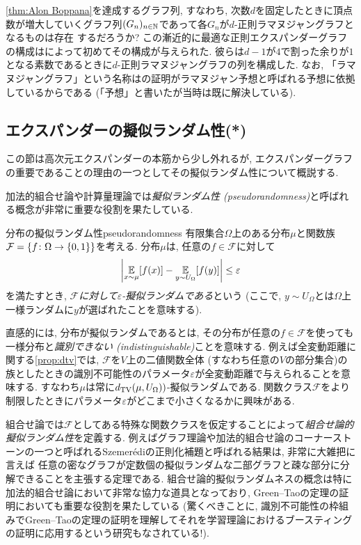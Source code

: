 \cref{thm:Alon Boppana}を達成するグラフ列, すなわち,
次数$d$を固定したときに頂点数が増大していくグラフ列$(G_n)_{n\in\mathbb{N}}$であって各$G_n$が$d$-正則ラマヌジャングラフとなるものは存在
するだろうか?
この漸近的に最適な正則エクスパンダーグラフの構成は\citet{LPS88}によって初めてその構成が与えられた.
彼らは$d-1$が$4$で割った余りが$1$となる素数であるときに$d$-正則ラマヌジャングラフの列を構成した.
なお, 「ラマヌジャングラフ」という名称は\cite{LPS88}の証明がラマヌジャン予想と呼ばれる予想に依拠しているからである
(「予想」と書いたが当時は既に解決している).

\subsection{エクスパンダーの擬似ランダム性(*)} \label{sec:expander pseudorandom}
この節は高次元エクスパンダーの本筋から少し外れるが,
エクスパンダーグラフの重要であることの理由の一つとしてその擬似ランダム性について概説する.

加法的組合せ論や計算量理論では\emph{擬似ランダム性 (pseudorandomness)}と呼ばれる概念が非常に重要な役割を果たしている.
\begin{definition}{分布の擬似ランダム性}{pseudorandomness}
    有限集合$\Omega$上のある分布$\mu$と関数族$\mathcal{F}=\{f\colon \Omega \to \{0,1\}\}$を考える.
    分布$\mu$は,
    任意の$f\in \mathcal{F}$に対して
    \[ \left\lvert\operatorname*{\mathbb{E}}_{x\sim \mu} [f(x)] - \operatorname*{\mathbb{E}}_{y\sim U_{\Omega}}[f(y)]\right\rvert \le \varepsilon\]
    を満たすとき, \emph{$\mathcal{F}$に対して$\varepsilon$-擬似ランダムである}という (ここで, $y\sim U_\Omega$とは$\Omega$上一様ランダムに$y$が選ばれたことを意味する).
\end{definition}
直感的には, 分布が擬似ランダムであるとは, その分布が任意の$f\in \mathcal{F}$を使っても一様分布と\emph{識別できない (indistinguishable)}ことを意味する.
例えば全変動距離に関する\cref{prop:dtv}では, $\mathcal{F}$を$V$上の二値関数全体 (すなわち任意の$V$の部分集合)の族としたときの識別不可能性のパラメータ$\varepsilon$が全変動距離で与えられることを意味する.
すなわち$\mu$は常に$d_{\mathrm{TV}}(\mu,U_{\Omega}))$-擬似ランダムである.
関数クラス$\mathcal{F}$をより制限したときにパラメータ$\varepsilon$がどこまで小さくなるかに興味がある.

組合せ論では$\mathcal{F}$としてある特殊な関数クラスを仮定することによって\emph{組合せ論的擬似ランダム性}を定義する.
例えばグラフ理論や加法的組合せ論のコーナーストーンの一つと呼ばれるSzemerédiの正則化補題と呼ばれる結果は, 非常に大雑把に言えば
任意の密なグラフが定数個の擬似ランダムな二部グラフと疎な部分に分解できることを主張する定理である.
組合せ論的擬似ランダムネスの概念は特に加法的組合せ論において非常な協力な道具となっており,
Green--Taoの定理の証明においても重要な役割を果たしている
(驚くべきことに, 識別不可能性の枠組みでGreen--Taoの定理の証明を理解してそれを学習理論におけるブースティングの証明に応用するという研究もなされている!).

